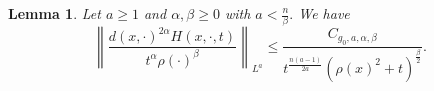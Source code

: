 \documentclass[10pt,a4paper]{amsart}
\newtheorem{comment}{Comment}
\newtheorem{lemma}{Lemma}
\begin{document}
\begin{lemma}\label{lemma:heatkernelLpests}
    Let $a \geq 1$ and $\alpha, \beta \geq 0$ with $a < \frac{n}{\beta}.$ %
    We have
        \begin{equation}\label{HLarhobnorm}
        \left\|  \frac{d(x,\cdot)^{2\alpha} H(x,\cdot, t) }{t^\alpha \rho(\cdot)^\beta} \right\|_{L^{a}} \leq \frac{C_{g_0,a,\alpha, \beta} }{t^{\frac{n(a - 1)}{2a}} \left( \rho(x)^{2} + t \right)^{\frac{\beta}{2}} }.
        \end{equation}

\end{lemma}
\end{document}
